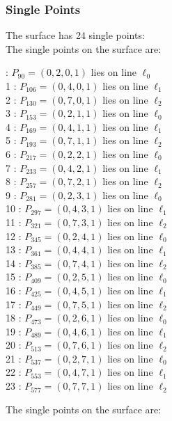 \documentclass{article}
\begin{document}
{\subsubsection*{Single Points}
The surface has 24 single points:\\
The single points on the surface are:\\
\begin{multicols}{2}
 : $P_{90}=( 0, 2, 0, 1 )$ lies on line $\ell_{0}$\\
1 : $P_{106}=( 0, 4, 0, 1 )$ lies on line $\ell_{1}$\\
2 : $P_{130}=( 0, 7, 0, 1 )$ lies on line $\ell_{2}$\\
3 : $P_{153}=( 0, 2, 1, 1 )$ lies on line $\ell_{0}$\\
4 : $P_{169}=( 0, 4, 1, 1 )$ lies on line $\ell_{1}$\\
5 : $P_{193}=( 0, 7, 1, 1 )$ lies on line $\ell_{2}$\\
6 : $P_{217}=( 0, 2, 2, 1 )$ lies on line $\ell_{0}$\\
7 : $P_{233}=( 0, 4, 2, 1 )$ lies on line $\ell_{1}$\\
8 : $P_{257}=( 0, 7, 2, 1 )$ lies on line $\ell_{2}$\\
9 : $P_{281}=( 0, 2, 3, 1 )$ lies on line $\ell_{0}$\\
10 : $P_{297}=( 0, 4, 3, 1 )$ lies on line $\ell_{1}$\\
11 : $P_{321}=( 0, 7, 3, 1 )$ lies on line $\ell_{2}$\\
12 : $P_{345}=( 0, 2, 4, 1 )$ lies on line $\ell_{0}$\\
13 : $P_{361}=( 0, 4, 4, 1 )$ lies on line $\ell_{1}$\\
14 : $P_{385}=( 0, 7, 4, 1 )$ lies on line $\ell_{2}$\\
15 : $P_{409}=( 0, 2, 5, 1 )$ lies on line $\ell_{0}$\\
16 : $P_{425}=( 0, 4, 5, 1 )$ lies on line $\ell_{1}$\\
17 : $P_{449}=( 0, 7, 5, 1 )$ lies on line $\ell_{2}$\\
18 : $P_{473}=( 0, 2, 6, 1 )$ lies on line $\ell_{0}$\\
19 : $P_{489}=( 0, 4, 6, 1 )$ lies on line $\ell_{1}$\\
20 : $P_{513}=( 0, 7, 6, 1 )$ lies on line $\ell_{2}$\\
21 : $P_{537}=( 0, 2, 7, 1 )$ lies on line $\ell_{0}$\\
22 : $P_{553}=( 0, 4, 7, 1 )$ lies on line $\ell_{1}$\\
23 : $P_{577}=( 0, 7, 7, 1 )$ lies on line $\ell_{2}$\\
\end{multicols}
The single points on the surface are:\\
}
\end{document}
